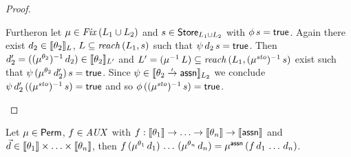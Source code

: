 \documentclass[12pt,a4paper]{report}
\newcommand{\ssto}{\nstyle{sto}}
\newcommand{\Fix}[1]{\nstyle{Fix}\,(#1)}
\newcommand{\AUX}{\nstyle{AUX}}
\begin{document}
\begin{proof}
\begin{itemize}
          Furtheron let $\mu \in \Fix{L_1 \cup L_2}$ and $s \in \mathsf{Store}_{L_1 \cup L_2}$ with $\phi\,s = \mathsf{true}$.
          Again there exist $d_2 \in \llbracket\theta_2\rrbracket_L$, $L \subseteq \mathit{reach}\,(L_1,s)$ such
          that $\psi\,d_2\,s=\mathsf{true}$. Then
          $d_2' = ((\mu^{\theta_2})^{-1}\,d_2)\in\llbracket\theta_2\rrbracket_{L'}$ and
          $L' = (\mu^{-1}\,L) \subseteq \reach{L_1}{(\mu^\ssto)^{-1}\,s}$ exist such that
          $\psi\,(\mu^{\theta_2}\,d_2')\,s=\mathsf{true}$.
          Since $\psi \in \llbracket\theta_2\stackrel{_t}{\to}\mathsf{assn}\rrbracket_{L_2}$ we conclude
          $\psi\,d_2'\,((\mu^\ssto)^{-1}\,s) = \true$ and so $\phi\,((\mu^\ssto)^{-1}\,s) = \true$.
  \end{itemize}
\end{proof}

\begin{lemma} \label{lemma:AUX_functions_and_permutations}
  Let $\mu \in \mathsf{Perm}$, $f \in \AUX$ with
  $f: \llbracket\theta_1\rrbracket \to \ldots \to \llbracket\theta_n\rrbracket \to \llbracket\mathsf{assn}\rrbracket$ and
  $\vec{d} \in \llbracket\theta_1\rrbracket \times \ldots \times \llbracket\theta_n\rrbracket$, then
  $f\,(\mu^{\theta_1}\,d_1)\,\ldots\,(\mu^{\theta_n}\,d_n)=\mu^{\mathsf{assn}}\,(f\,d_1\,\ldots\,d_n)$.
\end{lemma}
\end{document}
